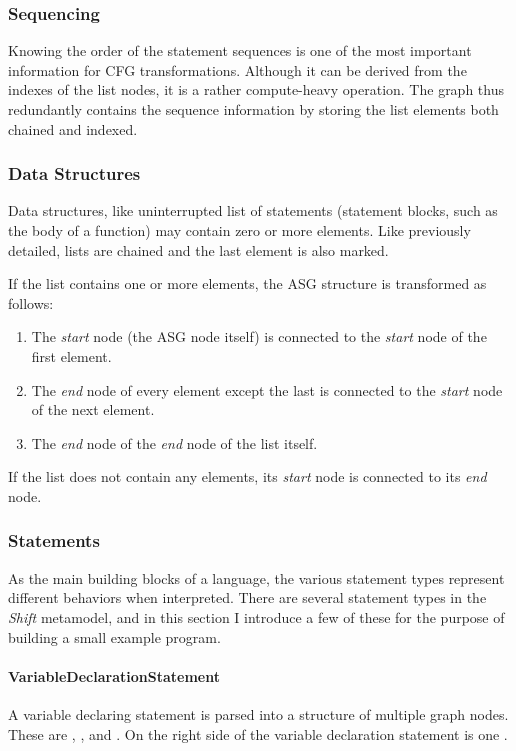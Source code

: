 \subsubsection{Sequencing}
Knowing the order of the statement sequences is one of the most important information for CFG transformations. Although it can be derived from the indexes of the list nodes, it is a rather compute-heavy operation. The graph thus redundantly contains the sequence information by storing the list elements both chained and indexed.

\subsubsection{Data Structures}
Data structures, like uninterrupted list of statements (statement blocks, such as the body of a function) may contain zero or more elements. Like previously detailed, lists are chained and the last element is also marked.

If the list contains one or more elements, the ASG structure is transformed as follows:
\begin{enumerate}[topsep=0pt]
	\item The \emph{start} node (the ASG node itself) is connected to the \emph{start} node of the first element.
	\item The \emph{end} node of every element except the last is connected to the \emph{start} node of the next element.
	\item The \emph{end} node of the \emph{end} node of the list itself.
\end{enumerate}


If the list does not contain any elements, its \emph{start} node is connected to its \emph{end} node.

\subsubsection{Statements}
As the main building blocks of a language, the various statement types represent different behaviors when interpreted. There are several statement types in the \emph{Shift} metamodel, and in this section I introduce a few of these for the purpose of building a small example program.

\paragraph{VariableDeclarationStatement}
A variable declaring statement is parsed into a structure of multiple graph nodes. These are , , and . On the right side of the variable declaration statement is one .

